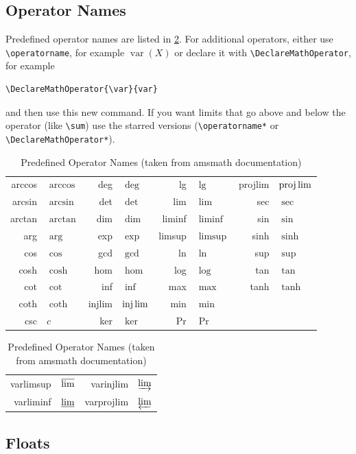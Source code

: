 \documentclass[ml4h-mathphys]{ml4h-jnl}%
\theoremstyle{thmstyleone}%
\theoremstyle{thmstyletwo}%
\theoremstyle{thmstylethree}%
\begin{document}
\subsection{Operator Names}
\label{sec:op}

Predefined operator names are listed in \ref{table:operatornames}.
For additional operators, either use \verb|\operatorname|,
for example $\operatorname{var}(X)$ or declare it with
\verb|\DeclareMathOperator|, for example
\begin{verbatim}
\DeclareMathOperator{\var}{var}
\end{verbatim}
and then use this new command. If you want limits that go above and
below the operator (like \verb|\sum|) use the starred versions
(\verb|\operatorname*| or \verb|\DeclareMathOperator*|).

\begin{table}[htbp]
  \label{table:operatornames}%
  {\caption{Predefined Operator Names (taken from 
   \textsf{amsmath} documentation)}}%
  {%
\begin{tabular}{rlrlrlrl}
arccos & $\arccos$ &  deg & $\deg$ &  lg & $\lg$ &  projlim & $\projlim$ \\
{arcsin} & $\arcsin$ &  {det} & $\det$ &  {lim} & $\lim$ &  {sec} & $\sec$ \\
{arctan} & $\arctan$ &  {dim} & $\dim$ &  {liminf} & $\liminf$ &  {sin} & $\sin$ \\
{arg} & $\arg$ &  {exp} & $\exp$ &  {limsup} & $\limsup$ &  {sinh} & $\sinh$ \\
{cos} & $\cos$ &  {gcd} & $\gcd$ &  {ln} & $\ln$ &  {sup} & $\sup$ \\
{cosh} & $\cosh$ &  {hom} & $\hom$ &  {log} & $\log$ &  {tan} & $\tan$ \\
{cot} & $\cot$ &  {inf} & $\inf$ &  {max} & $\max$ &  {tanh} & $\tanh$ \\
{coth} & $\coth$ &  {injlim} & $\injlim$ &  {min} & $\min$ \\
{csc} & $c$ &  {ker} & $\ker$ &  {Pr} & $\Pr$
\end{tabular}\par
\begin{tabular}{rlrl}
{varlimsup} & $\varlimsup$ 
& {varinjlim} & $\varinjlim$\\
{varliminf} & $\varliminf$ 
& {varprojlim} & $\varprojlim$
\end{tabular}
}
\end{table}

\subsection{Floats}
\label{sec:floats}
\end{document}
